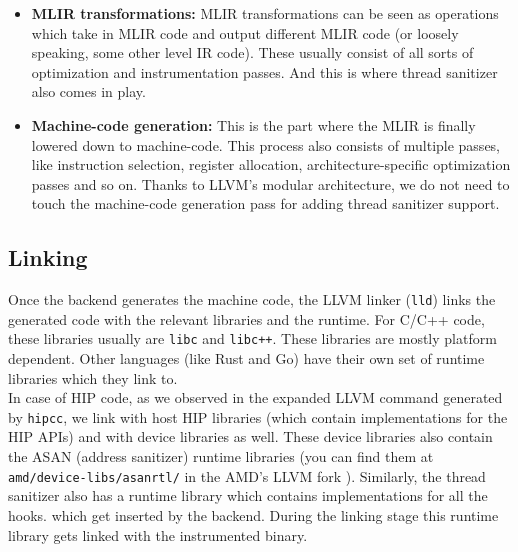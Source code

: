 \documentclass{btp}
\begin{document}
\begin{itemize}
	\item \textbf{MLIR transformations:} MLIR transformations can be seen as operations which take in MLIR code and output different MLIR code (or loosely speaking, some other level IR code). These usually consist of all sorts of optimization and instrumentation passes. And this is where thread sanitizer also comes in play.
	\item \textbf{Machine-code generation:} This is the part where the MLIR is finally lowered down to machine-code. This process also consists of multiple passes, like instruction selection, register allocation, architecture-specific optimization passes and so on. Thanks to LLVM's modular architecture, we do not need to touch the machine-code generation pass for adding thread sanitizer support.
\end{itemize}

\subsection{Linking}

Once the backend generates the machine code, the LLVM linker (\texttt{lld}) links the generated code with the relevant libraries and the runtime. For C/C++ code, these libraries usually are \texttt{libc} and \texttt{libc++}. These libraries are mostly platform dependent. Other languages (like Rust and Go) have their own set of runtime libraries which they link to.
\\
\newline
In case of HIP code, as we observed in the expanded LLVM command generated by \texttt{hipcc}, we link with host HIP libraries (which contain implementations for the HIP APIs) and with device libraries as well. These device libraries also contain the ASAN (address sanitizer) runtime libraries (you can find them at \texttt{amd/device-libs/asanrtl/} in the AMD's LLVM fork \cite{amd-llvm-fork}). Similarly, the thread sanitizer also has a runtime library which contains implementations for all the hooks. which get inserted by the backend. During the linking stage this runtime library gets linked with the instrumented binary.
\end{document}
